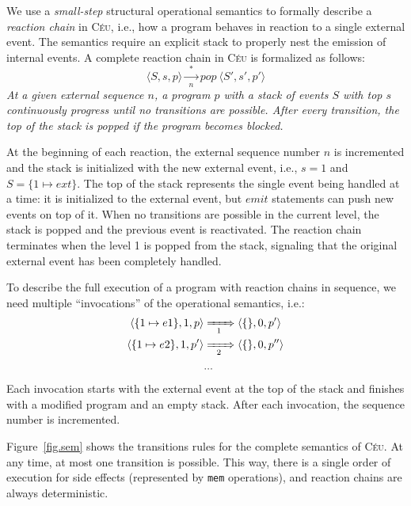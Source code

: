 \documentclass{acm_proc_article-sp}
\newcommand{\CEU}{\textsc{C\'{e}u}\xspace}
\newcommand{\code}[1] {{\small{\texttt{#1}}}}
\newcommand{\LL}{\langle}
\newcommand{\RR}{\rangle}
\newcommand{\1}{\;}
\newcommand{\2}{\;\;}
\newcommand{\3}{\;\;\;}
\newcommand{\5}{\;\;\;\;\;}
\begin{document}
We use a \emph{small-step} structural operational semantics to formally 
describe a \emph{reaction chain} in \CEU, i.e., how a program behaves in 
reaction to a single external event.
%
The semantics require an explicit stack to properly nest the emission of 
internal events.
%
A complete reaction chain in \CEU is formalized as follows:
%
$$
\LL S, s, p \RR
    \xrightarrow[~~n~~]{~~*~~}
pop~\LL S', s', p' \RR
$$
%
\emph{At a given external sequence $n$, a program $p$ with a stack of events 
$S$ with top $s$ continuously progress until no transitions are possible.
After every transition, the top of the stack is popped if the program becomes 
blocked.}

At the beginning of each reaction, the external sequence number $n$ is 
incremented and the stack is initialized with the new external event, i.e., 
$s=1$ and $S=\{ 1 \mapsto ext \}$.
%
%
The top of the stack represents the single event being handled at a time:
it is initialized to the external event, but $emit$ statements can push new 
events on top of it.
When no transitions are possible in the current level, the stack is popped and 
the previous event is reactivated.
The reaction chain terminates when the level 1 is popped from the stack, 
signaling that the original external event has been completely handled.

To describe the full execution of a program with reaction chains in sequence, 
we need multiple ``invocations'' of the operational semantics, i.e.:
%
\begin{align*}
\LL \{ 1 \mapsto e1 \}, 1, p \RR
    & \xRightarrow[~~1~~]{}
\LL \{\}, 0, p' \RR
\\
\LL \{ 1 \mapsto e2 \}, 1, p' \RR
    & \xRightarrow[~~2~~]{}
\LL \{\}, 0, p'' \RR
\\
& ...
\end{align*}
%
Each invocation starts with the external event at the top of the stack and 
finishes with a modified program and an empty stack.
After each invocation, the sequence number is incremented.

Figure~\ref{fig.sem} shows the transitions rules for the complete semantics of 
\CEU.
At any time, at most one transition is possible.
This way, there is a single order of execution for side effects (represented by 
\code{mem} operations), and reaction chains are always deterministic.
\end{document}
